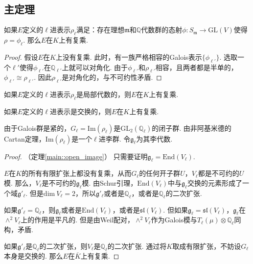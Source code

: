 \subsection{主定理}

\begin{cthm}
    如果$E$定义的$\ell$进表示$\rho_{\ell}$满足：存在理想$\mathfrak{m}$和$\mathbb{Q}$代数群的态射$\phi: S_{\mathfrak{m}}\to \mathrm{GL}(V)$使得$\rho = \phi_{\ell}$. 那么$E$在$K$上有复乘.
\end{cthm}

\begin{proof}
    假设$E$在$K$上没有复乘. 此时，有一族严格相容的Galois表示$\{\phi_{\ell'}\}$. 选取一个$\ell'$使得$\phi_{\ell'}$在$\mathbb{Q}_{\ell'}$上就可以对角化. 由于$\phi_{\ell'}$和$\rho_{\ell'}$相容，且两者都是半单的，$\phi_{\ell'}\cong \rho_{\ell'}$. 因此$\rho_{\ell'}$是对角化的，与不可约性矛盾.
\end{proof}

\begin{ccor}
    如果$E$定义的$\ell$进表示$\rho_{\ell}$是局部代数的，则$E$在$K$上有复乘. \label{reps::when_cm}
\end{ccor}

\begin{ccor}
    如果$E$定义的$\ell$进表示是交换的，则$E$在$K$上有复乘.
\end{ccor}

由于Galois群是紧的，$G_{\ell} = \mathrm{Im}(\rho_\ell)$是$\mathrm{GL}_2(\mathbb{Q}_{\ell})$的闭子群. 由非阿基米德的Cartan定理，$\mathrm{Im}(\rho_{\ell})$是一个$\ell$进李群. 令$\mathfrak{g}_{\ell}$为其李代数.

\begin{proof}
    （定理\ref{main::open_image}）
    只需要证明$\mathfrak{g}_{\ell} = \mathrm{End}(V_{\ell})$.

    $E$在$K$的所有有限扩张上都没有复乘，从而$G_{\ell}$的任何开子群$U$，$V_{\ell}$都是不可约的$U$模. 那么，$V_{\ell}$是不可约的$\mathfrak{g}_{\ell}$模. 由Schur引理，$\mathrm{End}(V_{\ell})$中与$\mathfrak{g}_{\ell}$交换的元素形成了一个域$\mathfrak{g}'_{\ell}$. 但是$\mathrm{dim}\ V_{\ell}=2$，所以$\mathfrak{g}'_{\ell}$或者是$\mathbb{Q}_{\ell}$，或者是$\mathbb{Q}_{\ell}$的二次扩张.

    如果$\mathfrak{g}'_{\ell} = \mathbb{Q}_{\ell}$，则$\mathfrak{g}_{\ell}$或者是$\mathrm{End}(V_{\ell})$，或者是$\mathfrak{sl}(V_{\ell})$. 但如果$\mathfrak{g}_{\ell} = \mathfrak{sl}(V_{\ell})$，$\mathfrak{g}_{\ell}$在$\wedge^2 V_{\ell}$上的作用是平凡的. 但是由Weil配对，$\wedge^2 V_{\ell}$作为Galois模与$T_{\ell}(\mu)\otimes \mathbb{Q}_{\ell}$同构，矛盾.

    如果$\mathfrak{g}'_{\ell}$是$\mathbb{Q}_{\ell}$的二次扩张，则$V_{\ell}$是$\mathbb{Q}_{\ell}$的二次扩张. 通过将$K$取成有限扩张，不妨设$G_{\ell}$本身是交换的.
    那么$E$在$\overline{K}$上有复乘.

\end{proof}
